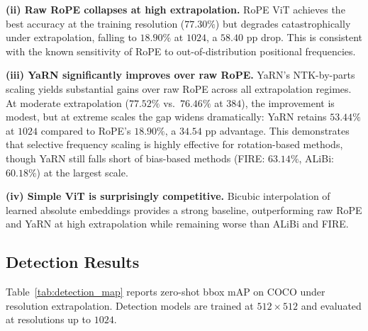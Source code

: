 \textbf{(ii) Raw RoPE collapses at high extrapolation.} RoPE ViT achieves the best accuracy at the
training resolution ($77.30\%$) but degrades catastrophically under extrapolation, falling to
$18.90\%$ at $1024$, a $58.40$ pp drop. This is consistent with the known sensitivity of RoPE to
out-of-distribution positional frequencies.

\textbf{(iii) YaRN significantly improves over raw RoPE.} YaRN's NTK-by-parts scaling yields substantial gains over raw RoPE across all extrapolation regimes. At moderate extrapolation ($77.52\%$ vs.\ $76.46\%$ at $384$), the improvement is modest, but at extreme scales the gap widens dramatically: YaRN retains $53.44\%$ at $1024$ compared to RoPE's $18.90\%$, a $34.54$ pp advantage. This demonstrates that selective frequency scaling is highly effective for rotation-based methods, though YaRN still falls short of bias-based methods (FIRE: $63.14\%$, ALiBi: $60.18\%$) at the largest scale.

\textbf{(iv) Simple ViT is surprisingly competitive.} Bicubic interpolation of learned absolute
embeddings provides a strong baseline, outperforming raw RoPE and YaRN at high extrapolation
while remaining worse than ALiBi and FIRE.

\subsection{Detection Results}

Table~\ref{tab:detection_map} reports zero-shot bbox mAP on COCO under resolution extrapolation.
Detection models are trained at $512 \times 512$ and evaluated at resolutions up to $1024$.

